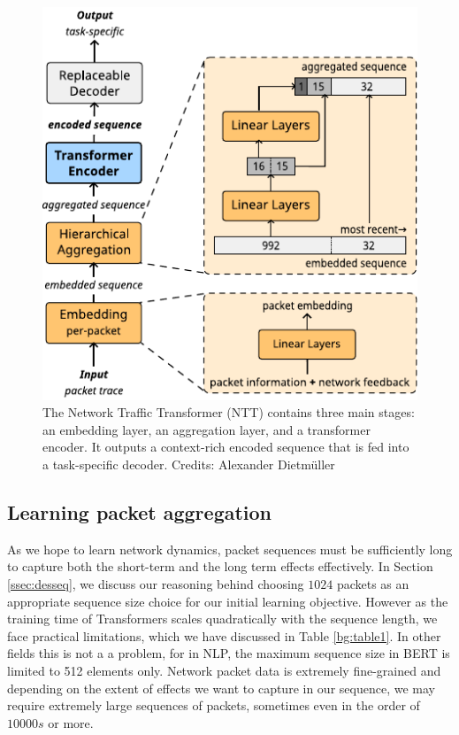 \begin{figure}[!hbt]
  \begin{center}
    \includegraphics[scale=1.5]{figures/architecture_ntt.pdf}
    \caption{The Network Traffic Transformer (NTT) contains three main stages:  %
        an embedding layer, %
        an aggregation layer, and
        a transformer encoder.
        It outputs a context-rich encoded sequence that is fed into a task-specific decoder. Credits: Alexander Dietmüller}
    \label{fig:ntt}
  \end{center}
\end{figure}



\subsection{Learning packet aggregation}
\label{ssec:desagg}


As we hope to learn network dynamics, packet sequences must be sufficiently long to capture both the short-term and the long term effects effectively. In Section \ref{ssec:desseq}, we discuss our reasoning behind choosing  $1024$ packets as an appropriate sequence size choice for our initial learning objective. However as the training time of Transformers scales quadratically with the sequence length, we face practical limitations, which we have discussed in Table \ref{bg:table1}. In other fields this is not a a problem, for \eg in NLP, the maximum sequence size in BERT is limited to 512 elements only\cite{devlinBERTPretrainingDeep2019}. Network packet data is extremely fine-grained and depending on the extent of effects we want to capture in our sequence, we may require extremely large sequences of packets, sometimes even in the order of $10000s$ or more.

